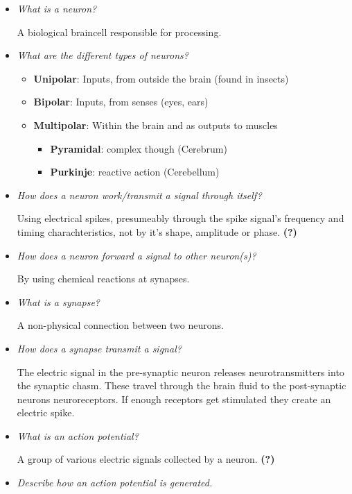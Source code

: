 \documentclass[
    fontsize      = 11pt,
    paper         = a4,
    twoside       = false,
    parskip       = half,
    pagesize      = false,
]{scrartcl}
\providecommand{\tightlist}{%
  \setlength{\itemsep}{0pt}\setlength{\parskip}{0pt}}
\begin{document}
\begin{itemize}
\item
  \emph{What is a neuron?}

  A biological braincell responsible for processing.
\item
  \emph{What are the different types of neurons?}

  \begin{itemize}
  \tightlist
  \item
    \textbf{Unipolar}: Inputs, from outside the brain (found in insects)
  \item
    \textbf{Bipolar}: Inputs, from senses (eyes, ears)
  \item
    \textbf{Multipolar}: Within the brain and as outputs to muscles

    \begin{itemize}
    \tightlist
    \item
      \textbf{Pyramidal}: complex though (Cerebrum)
    \item
      \textbf{Purkinje}: reactive action (Cerebellum)
    \end{itemize}
  \end{itemize}
\item
  \emph{How does a neuron work/transmit a signal through itself?}

  Using electrical spikes, presumeably through the spike signal's
  frequency and timing charachteristics, not by it's shape, amplitude or
  phase. \textbf{(?)}
\item
  \emph{How does a neuron forward a signal to other neuron(s)?}

  By using chemical reactions at synapses.
\item
  \emph{What is a synapse?}

  A non-physical connection between two neurons.
\item
  \emph{How does a synapse transmit a signal?}

  The electric signal in the pre-synaptic neuron releases
  neurotransmitters into the synaptic chasm. These travel through the
  brain fluid to the post-synaptic neurons neuroreceptors. If enough
  receptors get stimulated they create an electric spike.
\item
  \emph{What is an action potential?}

  A group of various electric signals collected by a neuron.
  \textbf{(?)}
\item
  \emph{Describe how an action potential is generated.}


\end{itemize}
\end{document}
